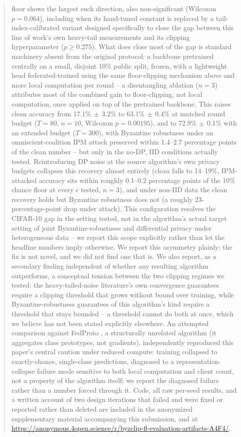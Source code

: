 \documentclass{article}
\begin{document}
\begin{abstract}
floor shows the largest such direction, also non-significant (Wilcoxon
$p{=}0.064$), including when its hand-tuned constant is replaced by a
tail-index-calibrated variant designed specifically to close the gap between
this line of work's own heavy-tail measurements and its clipping hyperparameter
($p \geq 0.275$).
What does close most of the gap is standard machinery absent from the original
protocol: a backbone pretrained centrally on a small, disjoint 10\% public split,
frozen, with a lightweight head federated-trained using the same floor-clipping
mechanism above and more local computation per round -- a disentangling
ablation ($n{=}3$) attributes most of the combined gain to floor-clipping, not
local computation, once applied on top of the pretrained backbone. This raises clean accuracy from
17.1\%$\,\pm\,$3.2\% to 63.1\%$\,\pm\,$0.4\% at matched round budget ($T{=}80$,
$n{=}10$, Wilcoxon $p{=}0.00195$), and to 72.9\%$\,\pm\,$0.1\% with an extended
budget ($T{=}300$), with Byzantine robustness under an omniscient-coalition IPM
attack preserved within 1.4--2.7 percentage points of the clean number -- but
only in the no-DP, IID conditions actually tested. Reintroducing DP noise at
the source algorithm's own privacy budgets collapses this recovery almost
entirely (clean falls to 14--19\%, IPM-attacked accuracy sits within roughly
0.1--0.2 percentage points of the 10\% chance floor at every $\epsilon$
tested, $n{=}3$), and under
non-IID data the clean recovery holds but Byzantine robustness does not (a
roughly 23-percentage-point drop under attack). This configuration resolves
the CIFAR-10 gap in the setting tested, not in the algorithm's actual target
setting of joint Byzantine-robustness and differential privacy under
heterogeneous data -- we report this scope explicitly rather than let the
headline numbers imply otherwise. We report this asymmetry plainly: the fix is
not novel, and we did not find one that is. We also report, as a secondary
finding independent of whether any
resulting algorithm outperforms, a conceptual tension between the two clipping
regimes we tested: the heavy-tailed-noise literature's own convergence guarantees
require a clipping threshold that grows without bound over training, while
Byzantine-robustness guarantees of this algorithm's kind require a threshold that
stays bounded -- a threshold cannot do both at once, which we believe has not
been stated explicitly elsewhere. An attempted comparison against FedProto
\citep{tan2022fedproto}, a structurally unrelated algorithm (it aggregates
class prototypes, not gradients), independently reproduced this paper's central
caution under reduced compute: training collapsed to exactly-chance,
single-class predictions, diagnosed to a representation-collapse failure mode
sensitive to both local computation and client count, not a property of the
algorithm itself; we report the diagnosed failure rather than a number forced
through it. Code, all raw per-seed results, and a written account of two design
iterations that failed and were fixed or reported rather than deleted are
included in the anonymized supplementary material accompanying this
submission, and at \url{https://anonymous.4open.science/r/byzclip-fl-evaluation-artifacts-A4F4/}.
\end{abstract}
\end{document}
